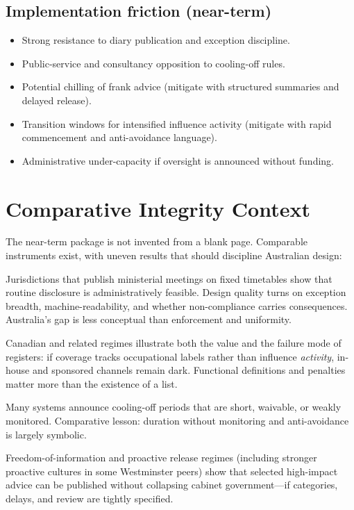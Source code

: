 \documentclass[11pt,a4paper]{article}
\begin{document}
\subsection{Implementation friction (near-term)}

\begin{itemize}[leftmargin=*]
    \item Strong resistance to diary publication and exception discipline.
    \item Public-service and consultancy opposition to cooling-off rules.
    \item Potential chilling of frank advice (mitigate with structured summaries and delayed release).
    \item Transition windows for intensified influence activity (mitigate with rapid commencement and anti-avoidance language).
    \item Administrative under-capacity if oversight is announced without funding.
\end{itemize}

\section{Comparative Integrity Context}

The near-term package is not invented from a blank page. Comparable instruments exist, with uneven results that should discipline Australian design:

\begin{description}[style=nextline,leftmargin=1.2em]
    \item[Ministerial diaries / access transparency.]
    Jurisdictions that publish ministerial meetings on fixed timetables show that routine disclosure is administratively feasible. Design quality turns on exception breadth, machine-readability, and whether non-compliance carries consequences. Australia’s gap is less conceptual than enforcement and uniformity.

    \item[Lobbying / influence registers.]
    Canadian and related regimes illustrate both the value and the failure mode of registers: if coverage tracks occupational labels rather than influence \emph{activity}, in-house and sponsored channels remain dark. Functional definitions and penalties matter more than the existence of a list.

    \item[Cooling-off / post-separation rules.]
    Many systems announce cooling-off periods that are short, waivable, or weakly monitored. Comparative lesson: duration without monitoring and anti-avoidance is largely symbolic.

    \item[Advice and decision records.]
    Freedom-of-information and proactive release regimes (including stronger proactive cultures in some Westminster peers) show that selected high-impact advice can be published without collapsing cabinet government---if categories, delays, and review are tightly specified.
\end{description}
\end{document}

